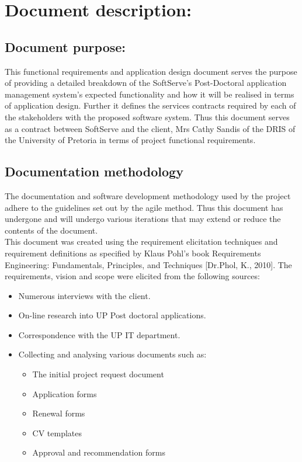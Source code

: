 \documentclass[12pt]{article}
\begin{document}
\listoffigures
\newpage
\section{Document description:}

\subsection{Document purpose:}
\vspace{0.2in}
This functional requirements and application design document serves the purpose of providing a detailed breakdown of the SoftServe's Post-Doctoral application management system's expected functionality and how it will be realised in terms of application design. Further it defines the services contracts required by each of the stakeholders with the proposed software system. Thus this document serves as a contract between SoftServe and the client, Mrs Cathy Sandis of the DRIS of the University of Pretoria in terms of project functional requirements.

\vspace{0.2in}

\subsection{Documentation methodology}
\vspace{0.2in}
\begin{flushleft}
The documentation and software development methodology used by the project adhere to the guidelines set out by the agile method. Thus this document has undergone and will undergo various iterations that may extend or reduce the contents of the document.\\

This document was created using the requirement elicitation techniques and requirement definitions as specified by Klaus Pohl’s book Requirements Engineering: Fundamentals, Principles, and Techniques [Dr.Phol, K., 2010].
The requirements, vision and scope were elicited from the following sources:
\begin{itemize}
	\item Numerous interviews with the client.
	\item On-line research into UP Post doctoral applications.
	\item Correspondence with the UP IT department.
	\item Collecting and analysing various documents such as:
		\begin{itemize}
			\item The initial project request document
			\item Application forms
			\item Renewal forms
			\item CV templates
			\item Approval and recommendation forms
		\end{itemize}
\end{itemize}
\end{flushleft}	
\end{document}
